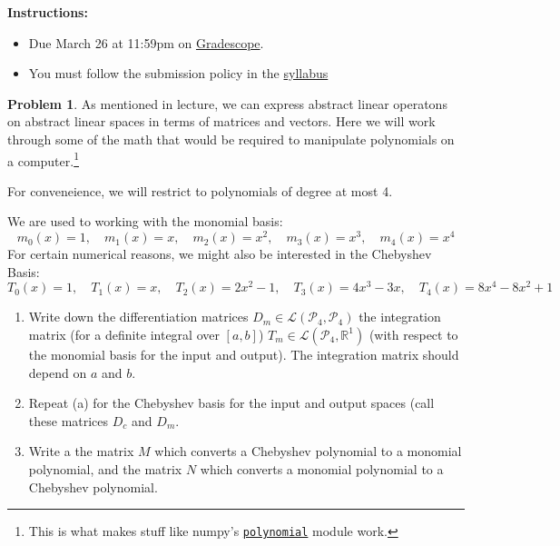 \documentclass[12pt]{article}
\theoremstyle{definition}
\newtheorem{problem}{Problem}
\begin{document}
\textbf{\Large{}}
    
\vspace{-1.8em}
\hrulefill


\textbf{Instructions:}
    \begin{itemize}
        \item Due March 26 at 11:59pm on \href{https://www.gradescope.com/courses/709136}{Gradescope}.
        \item You must follow the submission policy in the \href{https://courses.chen.pw/la_s2024/syllabus.html}{syllabus} 
\end{itemize}
   
\vspace{.5em}


\begin{problem}
As mentioned in lecture, we can express abstract linear operatons on abstract linear spaces in terms of matrices and vectors. 
Here we will work through some of the math that would be required to manipulate polynomials on a computer.\footnote{This is what makes stuff like numpy's \href{https://numpy.org/doc/stable/reference/routines.polynomials.html}{\texttt{polynomial}} module work.}

For conveneience, we will restrict to polynomials of degree at most 4.

We are used to working with the monomial basis:
\[
m_0(x) = 1, \quad
m_1(x) = x, \quad
m_2(x) = x^2, \quad
m_3(x) = x^3, \quad
m_4(x) = x^4
\]
For certain numerical reasons, we might also be interested in the Chebyshev Basis:
\[
T_0(x) = 1, \quad
T_1(x) = x, \quad
T_2(x) = 2x^2 - 1, \quad
T_3(x) = 4x^3 - 3x, \quad
T_4(x) = 8x^4 - 8x^2 + 1    
\]

\begin{enumerate}
    \item Write down the differentiation matrices $D_m\in \mathcal{L}(\mathcal{P}_4,\mathcal{P}_4)$ the integration matrix (for a definite integral over $[a,b]$) $T_m \in \mathcal{L}(\mathcal{P}_4,\mathbb{R}^1)$ (with respect to the monomial basis for the input and output). The integration matrix should depend on $a$ and $b$.
    \item Repeat (a) for the Chebyshev basis for the input and output spaces (call these matrices $D_c$ and $D_m$.
    \item Write a the matrix $M$ which converts a Chebyshev polynomial to a monomial polynomial, and the matrix $N$ which converts a monomial polynomial to a Chebyshev polynomial. 
\end{enumerate}

    
\end{problem}
\end{document}
